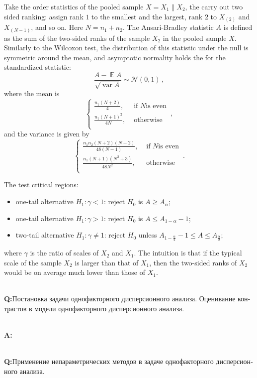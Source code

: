 \documentclass[a4paper]{article}
\newcommand{\Ncal}{\mathcal{N}}
\newcommand{\ex}{\mathop{\mathbb{E}}\nolimits}
\newcommand{\var}{\mathop{\text{var}}}
\newcommand{\rus}[1]{\foreignlanguage{russian}{#1}}
\begin{document}
Take the order statistics of the pooled sample $X = X_1 \| X_2$, the carry out two
sided ranking: assign rank $1$ to the smallest and the largest, rank $2$ to $X_{(2)}$
and $X_{(N-1)}$, and so on. Here $N=n_1+n_2$. The Ansari-Bradley statistic $A$ is
defined as the sum of the two-sided ranks of the sample $X_2$ in the pooled sample
$X$. Similarly to the Wilcoxon test, the distribution of this statistic under the
null is symmetric around the mean, and asymptotic normality holds the for the standardized
statistic:
$$ \frac{A - \ex A}{\sqrt{\var A}} \sim \Ncal(0, 1) \,, $$
where the mean is
$$ \begin{cases}
    \frac{n_1(N+2)}{4}, &\text{ if } N \text{is even}\\
    \frac{n_1(N+1)^2}{4 N}, &\text{ otherwise}\\
\end{cases} \,, $$
and the variance is given by
$$ \begin{cases}
    \frac{n_1 n_2(N+2)(N-2)}{48(N-1)}, &\text{ if } N \text{is even}\\
    \frac{n_1(N+1)(N^2+3)}{48 N^2}, &\text{ otherwise}\\
\end{cases} \,. $$

The test critical regions: \begin{itemize}
    \item one-tail alternative $H_1:\gamma < 1$: reject $H_0$ is $A\geq A_\alpha$;
    \item one-tail alternative $H_1:\gamma > 1$: reject $H_0$ is $A\leq A_{1-\alpha} - 1$;
    \item two-tail alternative $H_1:\gamma \neq 1$: reject $H_0$ unless
    $A_{1-\frac{\alpha}{2}} - 1 \leq A \leq A_\frac{\alpha}{2}$;
\end{itemize}
where $\gamma$ is the ratio of scales of $X_2$ and $X_1$.
The intuition is that if the typical scale of the sample $X_2$ is larger than that
of $X_1$, then the two-sided ranks of $X_2$ would be on average much lower than
those of $X_1$.


\hfill\\\noindent\textbf{Q:}\rus{Постановка задачи однофакторного дисперсионного
анализа. Оценивание контрастов в модели однофакторного дисперсионного анализа.}

\hfill\\\noindent\textbf{A:}

\hfill\\\noindent\textbf{Q:}\rus{Применение непараметрических методов в задаче однофакторного
дисперсионного анализа.}
\end{document}
